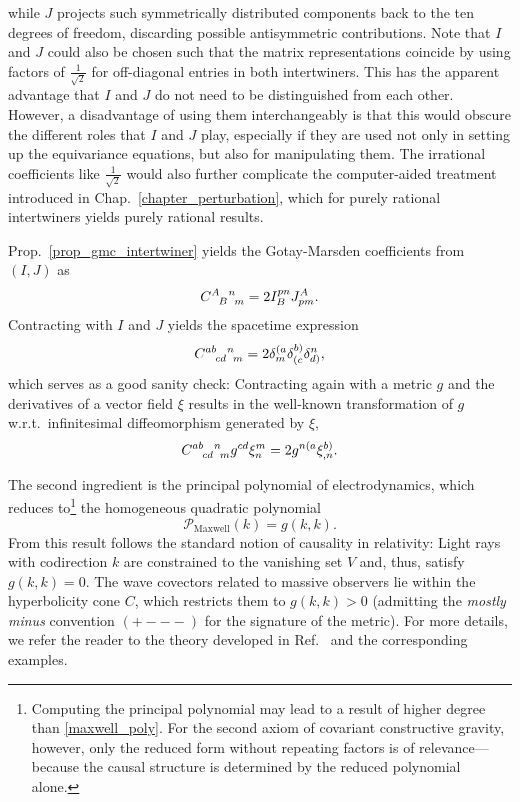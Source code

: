 while $J$ projects such symmetrically distributed components back to the ten degrees of freedom, discarding possible antisymmetric contributions. Note that $I$ and $J$ could also be chosen such that the matrix representations coincide by using factors of $\frac{1}{\sqrt 2}$ for off-diagonal entries in both intertwiners. This has the apparent advantage that $I$ and $J$ do not need to be distinguished from each other. However, a disadvantage of using them interchangeably is that this would obscure the different roles that $I$ and $J$ play, especially if they are used not only in setting up the equivariance equations, but also for manipulating them. The irrational coefficients like $\frac{1}{\sqrt 2}$ would also further complicate the computer-aided treatment introduced in Chap.~\ref{chapter_perturbation}, which for purely rational intertwiners yields purely rational results.

Prop.~\ref{prop_gmc_intertwiner} yields the Gotay-Marsden coefficients from $(I,J)$ as
\begin{equation}\label{gmc_metric}
  \gmc{A}{B}{n}{m} = 2 I^{pn}_B J^A_{pm}.
\end{equation}
Contracting with $I$ and $J$ yields the spacetime expression
\begin{equation}
  \gmc{ab}{cd}{n}{m} = 2 \delta^{(a}_m \delta^{b)}_{(c} \delta^n_{d)},
\end{equation}
which serves as a good sanity check: Contracting again with a metric $g$ and the derivatives of a vector field $\xi$ results in the well-known transformation of $g$ w.r.t.~infinitesimal diffeomorphism generated by $\xi$,
\begin{equation}
  \gmc{ab}{cd}{n}{m} g^{cd} \xi^m_n = 2g^{n(a} \xi^{b)}_{,n}.
\end{equation}

The second ingredient is the principal polynomial of electrodynamics, which reduces to\footnote{Computing the principal polynomial may lead to a result of higher degree than \eqref{maxwell_poly}. For the second axiom of covariant constructive gravity, however, only the reduced form without repeating factors is of relevance---because the causal structure is determined by the reduced polynomial alone\cite{sergio}.} the homogeneous quadratic polynomial\cite{sergio?}
\begin{equation}\label{maxwell_poly}
  \mathcal P_\text{Maxwell}(k) = g(k,k).
\end{equation}
From this result follows the standard notion of causality in relativity: Light rays with codirection $k$ are constrained to the vanishing set $V$ and, thus, satisfy $g(k,k)=0$. The wave covectors related to massive observers lie within the hyperbolicity cone $C$, which restricts them to $g(k,k) > 0$ (admitting the \emph{mostly minus} convention $(+---)$ for the signature of the metric). For more details, we refer the reader to the theory developed in Ref.~\cite{sergio,closure paper,?} and the corresponding examples.

